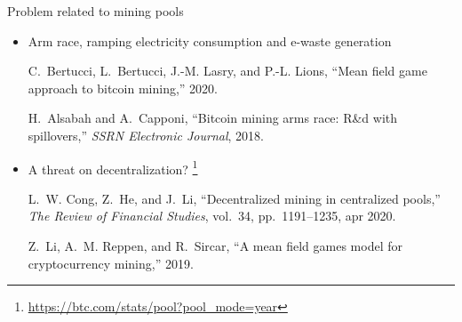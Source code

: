 \documentclass{beamer}
\newcommand\blfootnote[1]{%
  \begingroup
  \renewcommand\thefootnote{}\footnote{#1}%
  \addtocounter{footnote}{-1}%
  \endgroup
}
\begin{document}
\begin{frame}{Problem related to mining pools}
\begin{itemize}
  \item Arm race, ramping electricity consumption and e-waste generation
\tiny
\begin{thebibliography}{1}

C.~Bertucci, L.~Bertucci, J.-M. Lasry, and P.-L. Lions, ``Mean field game
  approach to bitcoin mining,'' 2020.

H.~Alsabah and A.~Capponi, ``Bitcoin mining arms race: R{\&}d with
  spillovers,'' {\em {SSRN} Electronic Journal}, 2018.

\end{thebibliography}
\end{itemize}
\begin{itemize}
  \item \normalsize A threat on decentralization?\blfootnote{\url{https://btc.com/stats/pool?pool_mode=year}}
\tiny
\begin{thebibliography}{1}

L.~W. Cong, Z.~He, and J.~Li, ``Decentralized mining in centralized pools,''
  {\em The Review of Financial Studies}, vol.~34, pp.~1191--1235, apr 2020.

Z.~Li, A.~M. Reppen, and R.~Sircar, ``A mean field games model for
  cryptocurrency mining,'' 2019.
\end{thebibliography}
\end{itemize}
\end{frame}
% 
% 
\end{document}
